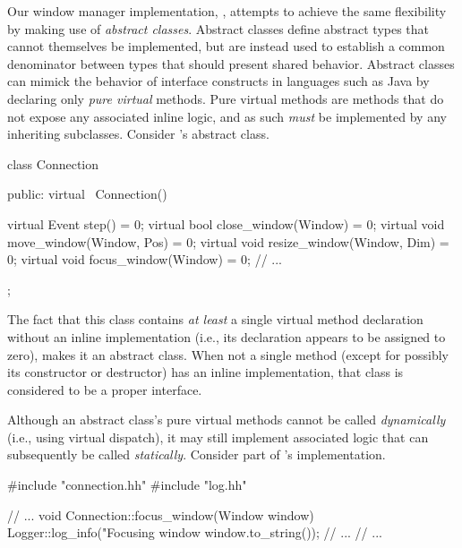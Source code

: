 
Our \cpp window manager implementation, \wmcpp, attempts to achieve the same
flexibility by making use of \textit{abstract classes}. Abstract classes define
abstract types that cannot themselves be implemented, but are instead used
to establish a common denominator between types that should present shared
behavior. Abstract classes can mimick the behavior of interface constructs in
languages such as Java by declaring only \textit{pure virtual} methods. Pure
virtual methods are methods that do not expose any associated inline logic, and
as such \textit{must} be implemented by any inheriting subclasses. Consider
\wmcpp's  abstract class.


\begin{cppblock}
  class Connection
  {
  public:
    virtual ~Connection() {}
  
    virtual Event step() = 0;
    virtual bool close_window(Window) = 0;
    virtual void move_window(Window, Pos) = 0;
    virtual void resize_window(Window, Dim) = 0;
    virtual void focus_window(Window) = 0;
    // ...
  };
\end{cppblock}

The fact that this class contains \textit{at least} a single virtual method
declaration without an inline implementation (i.e., its declaration appears
to be assigned to zero), makes it an abstract class. When not a single
method (except for possibly its constructor or destructor) has an inline
implementation, that class is considered to be a proper interface.

Although an abstract class's pure virtual methods cannot be called
\textit{dynamically} (i.e., using virtual dispatch), it may still implement
associated logic that can subsequently be called \textit{statically}. Consider
part of 's implementation.


\begin{cppblock}
  #include "connection.hh"
  #include "log.hh"

  // ...
  void
  Connection::focus_window(Window window)
  {
    Logger::log_info("Focusing window %
      window.to_string());
    // ...
  }
  // ...
\end{cppblock}

